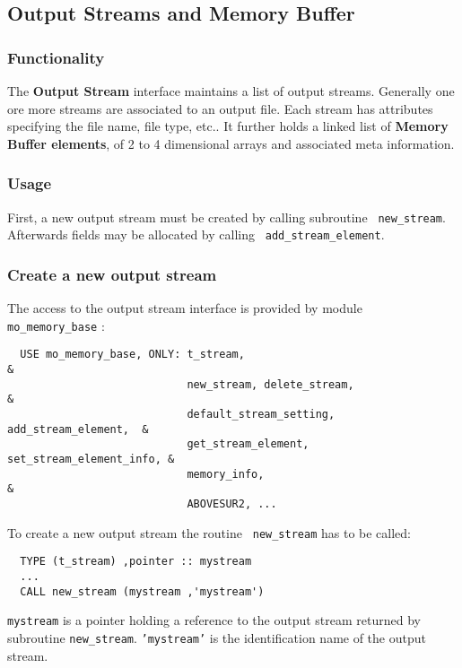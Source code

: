 \subsection{Output Streams and Memory Buffer}
\label{sec.output_stream}
\subsubsection{Functionality}

The {\bf Output Stream} interface maintains a list of output
streams. Generally one ore more streams are associated to an output
file. Each stream has attributes specifying the file name, file type,
etc.{}. It further holds a linked list of {\bf Memory Buffer elements},
of 2 to 4 dimensional arrays and associated meta information.

\subsubsection{Usage}

First, a new output stream must be created by calling subroutine {\tt
new\_stream}. 
Afterwards fields may be allocated by calling {\tt
add\_stream\_element}.

\subsubsection*{Create a new output stream}

The access to the output stream interface is provided by module {\tt
mo\_memory\_base}
:
%
{\small
\begin{verbatim}
  USE mo_memory_base, ONLY: t_stream,                                    &
                            new_stream, delete_stream,                   &
                            default_stream_setting, add_stream_element,  &
                            get_stream_element, set_stream_element_info, &
                            memory_info,                                 &
                            ABOVESUR2, ...
\end{verbatim}}
%
To create a new output stream the routine {\tt
new\_stream} has to be called:
%
{\small
\begin{verbatim}
  TYPE (t_stream) ,pointer :: mystream
  ...
  CALL new_stream (mystream ,'mystream')
\end{verbatim}}
%
{\tt mystream} is a pointer holding a reference to the output stream
returned by subroutine {\tt new\_stream}. {\tt 'mystream'} is the
identification name
of the output stream.

